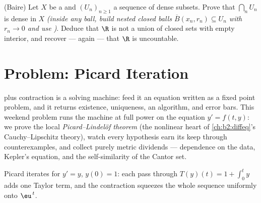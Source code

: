 \begin{exercise}[$\star\star\star$]\label{exo:b2:metric:12}
(Baire) Let $X$ be a  and $(U_n)_{n\geq1}$ a
sequence of dense  subsets. Prove that $\bigcap_n U_n$ is
dense in $X$ \emph{(inside any ball, build nested closed balls
$\overline B(x_n, r_n) \subseteq U_n$ with $r_n \to 0$ and use
)}. Deduce that $\R$ is not a  union of
closed sets with empty interior, and recover --- again --- that
$\R$ is uncountable.
\end{exercise}

\section{Problem: Picard Iteration}

 plus contraction is a solving machine: feed it an
equation written as a fixed point problem, and it returns
existence, uniqueness, an algorithm, and error bars. This weekend
problem runs the machine at full power on the equation $y' = f(t,
y)$: we prove the local \emph{Picard--Lindel\"of theorem} (the
nonlinear heart of \cref{ch:b2:diffeq}'s Cauchy--Lipschitz
theory), watch every hypothesis earn its keep through
counterexamples, and collect purely metric dividends ---
 dependence on the data, Kepler's equation, and the
self-similarity of the Cantor set.

\begin{omfigure}

{\small Picard iterates for $y' = y$, $y(0) = 1$: each pass
through $T(y)(t) = 1 + \int_0^t y$ adds one Taylor term, and the
contraction squeezes the whole sequence uniformly onto
$\eu^{\,t}$.}
\end{omfigure}

